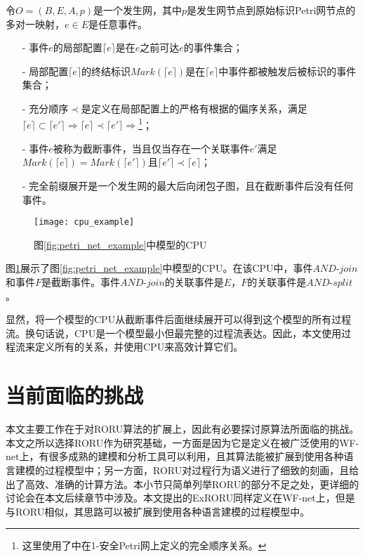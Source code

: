 \begin{definition}\label{def:cpu}
令$O=(B,E,A,p)$是一个发生网，其中$p$是发生网节点到原始标识Petri网节点的多对一映射，$e\in E$是任意事件。
  \begin{itemize}
  	\item[-] 事件$e$的局部配置$\lceil e\rceil$是在$e$之前可达$e$的事件集合；
  	\item[-] 局部配置$\lceil e\rceil$的终结标识$Mark(\lceil e\rceil)$是在$\lceil e\rceil$中事件都被触发后被标识的事件集合；
  	\item[-] 充分顺序$\prec$是定义在局部配置上的严格有根据的偏序关系，满足$\lceil e\rceil\subset\lceil e'\rceil\Rightarrow\lceil e\rceil\prec\lceil e'\rceil\Rightarrow$\footnote{这里使用了中在1-安全Petri网上定义的完全顺序关系。}；
  	\item[-] 事件$e$被称为截断事件，当且仅当存在一个关联事件$e'$满足$Mark(\lceil e\rceil)=Mark(\lceil e'\rceil)$且$\lceil e'\rceil\prec\lceil e\rceil$；
  	\item[-] 完全前缀展开是一个发生网的最大后向闭包子图，且在截断事件后没有任何事件。
  \end{itemize}
\end{definition}

\begin{figure}[htbp]
  \centering
  \texttt{[image: cpu\_example]}
  \caption{图\ref{fig:petri_net_example}中模型的CPU\label{fig:cpu_example}}
\end{figure}

图\ref{fig:cpu_example}展示了图\ref{fig:petri_net_example}中模型的CPU。在该CPU中，事件$AND$-$join$和事件$F$是截断事件。事件$AND$-$join$的关联事件是$E$，$F$的关联事件是$AND$-$split$。

显然，将一个模型的CPU从截断事件后面继续展开可以得到这个模型的所有过程流。换句话说，CPU是一个模型最小但最完整的过程流表达。因此，本文使用过程流来定义所有的关系，并使用CPU来高效计算它们。

\section{当前面临的挑战}\label{sec:challenge}
本文主要工作在于对RORU算法的扩展上，因此有必要探讨原算法所面临的挑战。本文之所以选择RORU作为研究基础，一方面是因为它是定义在被广泛使用的WF-net上，有很多成熟的建模和分析工具可以利用，且其算法能被扩展到使用各种语言建模的过程模型中；另一方面，RORU对过程行为语义进行了细致的刻画，且给出了高效、准确的计算方法。本小节只简单列举RORU的部分不足之处，更详细的讨论会在本文后续章节中涉及。本文提出的ExRORU同样定义在WF-net上，但是与RORU相似，其思路可以被扩展到使用各种语言建模的过程模型中。

